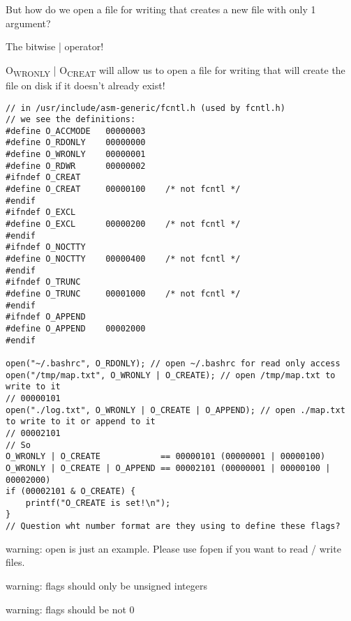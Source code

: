 \documentclass[11pt]{article}
\begin{document}
But how do we open a file for writing that creates a new file with only 1 argument?

The bitwise | operator! 

O\textsubscript{WRONLY} | O\textsubscript{CREAT} will allow us to open a file for writing that will
create the file on disk if it doesn't already exist!


\begin{verbatim}
// in /usr/include/asm-generic/fcntl.h (used by fcntl.h)
// we see the definitions:
#define O_ACCMODE	00000003
#define O_RDONLY	00000000
#define O_WRONLY	00000001
#define O_RDWR		00000002
#ifndef O_CREAT
#define O_CREAT		00000100	/* not fcntl */
#endif
#ifndef O_EXCL
#define O_EXCL		00000200	/* not fcntl */
#endif
#ifndef O_NOCTTY
#define O_NOCTTY	00000400	/* not fcntl */
#endif
#ifndef O_TRUNC
#define O_TRUNC		00001000	/* not fcntl */
#endif
#ifndef O_APPEND
#define O_APPEND	00002000
#endif

open("~/.bashrc", O_RDONLY); // open ~/.bashrc for read only access
open("/tmp/map.txt", O_WRONLY | O_CREATE); // open /tmp/map.txt to write to it
// 00000101
open("./log.txt", O_WRONLY | O_CREATE | O_APPEND); // open ./map.txt to write to it or append to it
// 00002101
// So 
O_WRONLY | O_CREATE            == 00000101 (00000001 | 00000100)
O_WRONLY | O_CREATE | O_APPEND == 00002101 (00000001 | 00000100 | 00002000)
if (00002101 & O_CREATE) {
    printf("O_CREATE is set!\n");
}
// Question wht number format are they using to define these flags?
\end{verbatim}

warning: open is just an example. Please use fopen if you want to read / write files.

warning: flags should only be unsigned integers

warning: flags should be not 0
\end{document}
